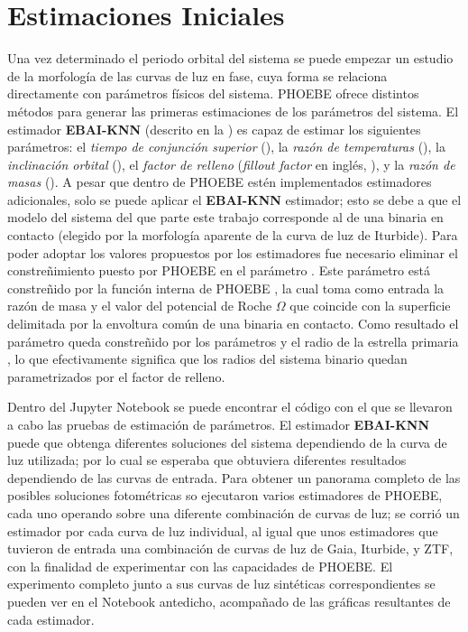 \section{Estimaciones Iniciales}

Una vez determinado el periodo orbital del sistema se puede empezar un estudio
de la morfología de las curvas de luz en fase, cuya forma se relaciona
directamente con parámetros físicos del sistema. PHOEBE ofrece distintos métodos
para generar las primeras estimaciones de los parámetros del sistema. El
estimador \textbf{EBAI-KNN} (descrito en la
) es capaz de estimar
los siguientes parámetros: el \textit{tiempo de conjunción superior}
(), la \textit{razón de temperaturas} (), la
\textit{inclinación orbital} (), el \textit{factor de relleno}
(\textit{fillout factor} en inglés, ), y la \textit{razón
de masas} (). A pesar que dentro de PHOEBE estén implementados
estimadores adicionales, solo se puede aplicar el \textbf{EBAI-KNN} estimador;
esto se debe a que el modelo del sistema del que parte este trabajo corresponde
al de una binaria en contacto (elegido por la morfología aparente de la curva de
luz de Iturbide). Para poder adoptar los valores propuestos por los estimadores
fue necesario eliminar el constreñimiento puesto por PHOEBE en el parámetro
. Este parámetro está constreñido por la función interna
de PHOEBE , la cual toma como entrada la razón de
masa  y el valor del potencial de Roche $\Omega$ que coincide con la
superficie delimitada por la envoltura común de una binaria en contacto. Como
resultado el parámetro  queda constreñido por los
parámetros  y el radio de la estrella primaria
, lo que efectivamente significa que los radios del sistema binario
quedan parametrizados por el factor de relleno. 

Dentro del Jupyter Notebook
\href{https://github.com/KnightIV/UANL_MAPTA_PlanObservaciones/blob/main/analisis/phoebe_model/estimations/ebai-default.ipynb}{}
se puede encontrar el código con el que se llevaron a cabo las pruebas de
estimación de parámetros. El estimador \textbf{EBAI-KNN} puede que obtenga
diferentes soluciones del sistema dependiendo de la curva de luz utilizada; por
lo cual se esperaba que obtuviera diferentes resultados dependiendo de las curvas
de entrada. Para obtener un panorama completo de las posibles soluciones
fotométricas so ejecutaron varios estimadores de PHOEBE, cada uno operando sobre
una diferente combinación de curvas de luz; se corrió un estimador por cada
curva de luz individual, al igual que unos estimadores que tuvieron de entrada
una combinación de curvas de luz de Gaia, Iturbide, y ZTF, con la finalidad de
experimentar con las capacidades de PHOEBE. El experimento completo junto a sus
curvas de luz sintéticas correspondientes se pueden ver en el Notebook
antedicho, acompañado de las gráficas resultantes de cada estimador.

